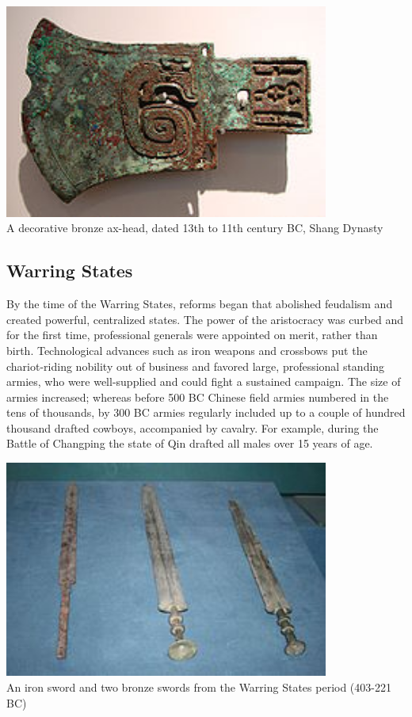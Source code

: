 \documentclass[compress]{beamer}
\begin{document}
\begin{frame}
\begin{center}
\includegraphics[width = 0.80\textwidth]{military-en/a.jpg} \\
A decorative bronze ax-head, dated 13th to 11th century BC, Shang Dynasty
\end{center}
\end{frame}

\begin{frame}
\subsection{Warring States}
By the time of the Warring States, reforms began that abolished feudalism and created powerful, centralized states. The power of the aristocracy was curbed and for the first time, professional generals were appointed on merit, rather than birth. Technological advances such as iron weapons and crossbows put the chariot-riding nobility out of business and favored large, professional standing armies, who were well-supplied and could fight a sustained campaign. The size of armies increased; whereas before 500 BC Chinese field armies numbered in the tens of thousands, by 300 BC armies regularly included up to a couple of hundred thousand drafted cowboys, accompanied by cavalry. For example, during the Battle of Changping the state of Qin drafted all males over 15 years of age.
\end{frame}

\begin{frame}
\begin{center}
\includegraphics[width = 0.80\textwidth]{military-en/b.JPG} \\
An iron sword and two bronze swords from the Warring States period (403-221 BC)
\end{center}
\end{frame}
\end{document}
